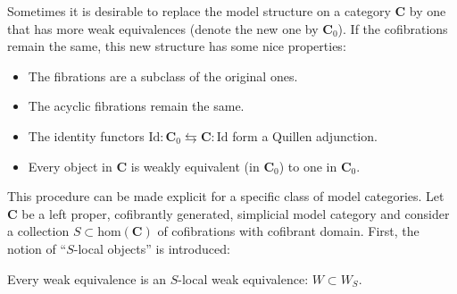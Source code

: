     Sometimes it is desirable to replace the model structure on a category $\mathbf{C}$ by one that has more weak equivalences (denote the new one by $\mathbf{C}_0$). If the cofibrations remain the same, this new structure has some nice properties:
    \begin{itemize}
        \item The fibrations are a subclass of the original ones.
        \item The acyclic fibrations remain the same.
        \item The identity functors $\mathrm{Id}:\mathbf{C}_0\leftrightarrows\mathbf{C}:\mathrm{Id}$ form a Quillen adjunction.
        \item Every object in $\mathbf{C}$ is weakly equivalent (in $\mathbf{C}_0$) to one in $\mathbf{C}_0$.
    \end{itemize}

    This procedure can be made explicit for a specific class of model categories. Let $\mathbf{C}$ be a left proper, cofibrantly generated, simplicial model category and consider a collection $S\subset\mathrm{hom}(\mathbf{C})$ of cofibrations with cofibrant domain. First, the notion of ``$S$-local objects'' is introduced:
    \begin{property}
        Every weak equivalence is an $S$-local weak equivalence: $W\subset W_S$.
    \end{property}

